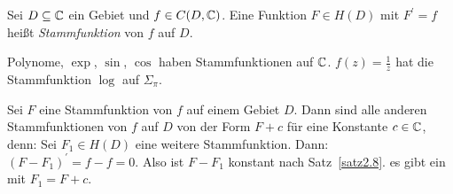 \documentclass[a4paper,twoside,DIV15,BCOR12mm]{scrbook}
\begin{document}
\begin{dfn}
  Sei $D\subseteq\mathbb{C}$ ein Gebiet und $f\in C(D,\mathbb{C})$. Eine Funktion $F\in H(D)$ mit $F^\prime=f$ heißt \emph{Stammfunktion} von
  $f$ auf $D$.
\end{dfn}

\begin{bsp*}
  Polynome, $\exp$, $\sin$, $\cos$ haben Stammfunktionen auf $\mathbb{C}$. $f(z)=\frac1z$ hat die Stammfunktion $\log$ auf
  $\Sigma_\pi$.
\end{bsp*}

\begin{bem} \label{bem2.12}
  Sei $F$ eine Stammfunktion von $f$ auf einem Gebiet $D$. Dann sind alle anderen Stammfunktionen von $f$ auf $D$ von der Form
  $F+c$ für eine Konstante $c\in\mathbb{C}$, denn: Sei $F_1\in H(D)$ eine weitere Stammfunktion. Dann: $(F-F_1)^\prime = f-f = 0$. Also
  ist $F-F_1$ konstant nach Satz~\ref{satz2.8}. \folgt es gibt ein  mit $F_1=F+c$.
\end{bem}
\end{document}

